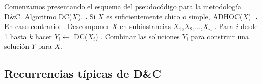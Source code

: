 \documentclass[10pt,a4paper]{article}
\begin{document}
Comenzamos presentando el esquema del pseudocódigo para la metodología D\&C.
\newline
\newline
Algoritmo DC($X$).
\newline
\newline
\textbf{.} Si $X$ es suficientemente chico o simple, ADHOC($X$).
\newline
\newline
\textbf{.} En caso contrario:
\newline
{}. Descomponer $X$ en subinstancias $X_{1}$,$X_{2}$,...,$X_{n}$
\newline
{}. Para $i$ desde 1 hasta $k$ hacer $Y_{i} \leftarrow$ DC($X_{i}$)
\newline
{}. Combinar las soluciones $Y_{i}$ para construir una solución $Y$ para $X$.

\subsection{Recurrencias típicas de D\&C}
\end{document}
